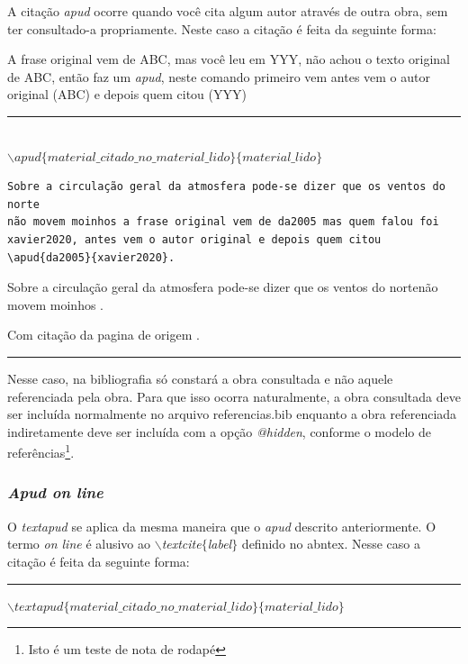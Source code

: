   \par A citação \textit{apud} ocorre quando você cita algum autor através de outra obra, sem ter consultado-a propriamente. Neste caso a citação é feita da seguinte forma:
   
   A frase original vem de ABC, mas você leu em YYY, não achou o texto original de ABC, então faz um \textit{apud}, neste comando primeiro vem antes vem o autor original (ABC) e depois quem citou (YYY)
  
  \begin{center}
  \rule{0.5\textwidth}{1pt}\\ 
  $\backslash apud\{material\_citado\_no\_material\_lido\}\{material\_lido\}$ \\
  \end{center}
\begin{verbatim}
Sobre a circulação geral da atmosfera pode-se dizer que os ventos do norte
não movem moinhos a frase original vem de da2005 mas quem falou foi xavier2020, antes vem o autor original e depois quem citou \apud{da2005}{xavier2020}. 
\end{verbatim}
  
  Sobre a circulação geral da atmosfera pode-se dizer que os ventos do nortenão movem moinhos .
  
  Com citação da pagina de origem .
  
\begin{center}\rule{0.5\textwidth}{1pt}\end{center}  
  \par Nesse caso, na bibliografia só constará a obra consultada e não aquele referenciada pela obra. Para que isso ocorra naturalmente, a obra consultada deve ser incluída normalmente no arquivo referencias.bib enquanto a obra referenciada indiretamente deve ser incluída com a opção \textit{@hidden}, conforme o modelo de referências\footnote{Isto é um teste de nota de rodapé}.

      \subsubsection{\textit{Apud on line}}

      
      \par O \textit{textapud} se aplica da mesma maneira que o \textit{apud} descrito anteriormente. O termo \textit{on line} é alusivo ao \textit{$\backslash$textcite$\{$label$\}$} definido no abntex. Nesse caso a citação é feita da seguinte forma:
      \begin{center}
      \rule{0.5\textwidth}{1pt}
            $\backslash textapud\{material\_citado\_no\_material\_lido\}\{material\_lido\}$ \\
	    \end{center}

